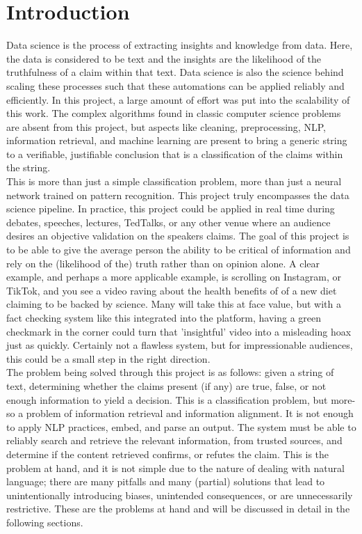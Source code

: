 \documentclass[11pt,letterpaper]{article}
\newcommand{\intro}[1]{
    \section*{Introduction}
    \addcontentsline{toc}{section}{Introduction}
    #1
}
\begin{document}
\intro{

    Data science is the process of extracting insights and knowledge from data. Here, the data is considered to be text and the insights are the likelihood of the truthfulness of a claim within that text. Data science is also the science behind scaling these processes such that these automations can be applied reliably and efficiently. In this project, a large amount of effort was put into the scalability of this work. The complex algorithms found in classic computer science problems are absent from this project, but aspects like cleaning, preprocessing, NLP, information retrieval, and machine learning are present to bring a generic string to a verifiable, justifiable conclusion that is a classification of the claims within the string. \\

    This is more than just a simple classification problem, more than just a neural network trained on pattern recognition. This project truly encompasses the data science pipeline. In practice, this project could be applied in real time during debates, speeches, lectures, TedTalks, or any other venue where an audience desires an objective validation on the speakers claims. The goal of this project is to be able to give the average person the ability to be critical of information and rely on the (likelihood of the) truth rather than on opinion alone. A clear example, and perhaps a more applicable example, is scrolling on Instagram, or TikTok, and you see a video raving about the health benefits of of a new diet claiming to be backed by science. Many will take this at face value, but with a fact checking system like this integrated into the platform, having a green checkmark in the corner could turn that 'insightful' video into a misleading hoax just as quickly. Certainly not a flawless system, but for impressionable audiences, this could be a small step in the right direction. \\

    The problem being solved through this project is as follows: given a string of text, determining whether the claims present (if any) are true, false, or not enough information to yield a decision. This is a classification problem, but more-so a problem of information retrieval and information alignment. It is not enough to apply NLP practices, embed, and parse an output. The system must be able to reliably search and retrieve the relevant information, from trusted sources, and determine if the content retrieved confirms, or refutes the claim. This is the problem at hand, and it is not simple due to the nature of dealing with natural language; there are many pitfalls and many (partial) solutions that lead to unintentionally introducing biases, unintended consequences, or are unnecessarily restrictive. These are the problems at hand and will be discussed in detail in the following sections. \\

}
\end{document}
